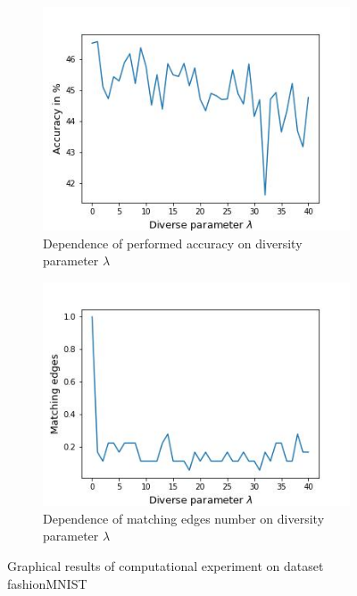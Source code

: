 \documentclass{article}
\begin{document}
\begin{figure}[h]
	\centering
	\begin{subfigure}{.46\textwidth}
        \centering
	    \includegraphics[width=1\linewidth]{fig2fashion}
	  \caption{Dependence of performed accuracy on diversity parameter $\lambda$}
	  \label{fig:graph1fashion}
	\end{subfigure}%
    \hspace{1cm}
	\begin{subfigure}{.46\textwidth}
	  \centering
	  \includegraphics[width=1\linewidth]{fig3fashion}
	  \caption{Dependence of matching edges number on diversity parameter $\lambda$}
	  \label{fig:graph2fashion}
	\end{subfigure}
	\caption{Graphical results of computational experiment on dataset fashionMNIST}
	\label{fig:graphfashion}
\end{figure}
\end{document}
